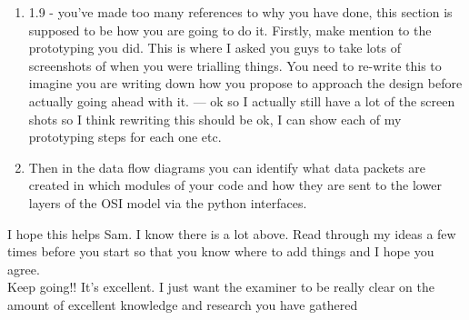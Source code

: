 \documentclass{article}
\begin{document}
\begin{enumerate}
  \item{1.9 - you’ve made too many references to why you have done, this section is supposed to be how you are going to do it. Firstly, make mention to the prototyping you did. This is where I asked you guys to take lots of screenshots of when you were trialling things. You need to re-write this to imagine you are writing down how you propose to approach the design before actually going ahead with it. --- ok so I actually still have a lot of the screen shots so I think rewriting this should be ok, I can show each of my prototyping steps for each one etc.}
  \item{Then in the data flow diagrams you can identify what data packets are created in which modules of your code and how they are sent to the lower layers of the OSI model via the python interfaces.}
\end{enumerate}


I hope this helps Sam. I know there is a lot above. Read through my ideas a few times before you start so that you know where to add things and I hope you agree. \\
                    

Keep going!! It’s excellent. I just want the examiner to be really clear on the amount of excellent knowledge and research you have gathered
\end{document}
